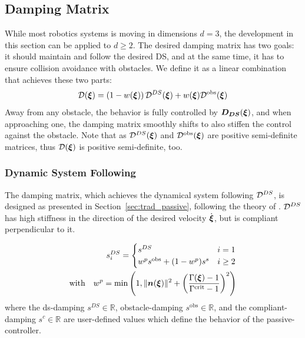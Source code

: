 \documentclass[conference]{IEEEtran}
\begin{document}
\subsection{Damping Matrix}
While most robotics systems is moving in dimensions $d = 3$, the development in this section can be applied to $d \geq 2$.
The desired damping matrix has two goals: it should maintain and follow the desired DS, and at the same time, it has to ensure collision avoidance with obstacles. We define it as a linear combination that achieves these two parts:
\begin{equation}
    \matd D(\vecs\xi) = \left(1 - w(\vecs\xi) \right) {\matd D^{DS}}(\vecs\xi) + w(\vecs\xi)  {\matd D^{\mathrm{obs}}}(\vecs\xi) \label{eq:damping_summation}
\end{equation}
Away from any obstacle, the behavior is fully controlled by $\boldsymbol{D_{DS}}(\boldsymbol{\xi})$, and when approaching one, the damping matrix smoothly shifts to also stiffen the control against the obstacle. 
Note that as ${\mathcal{D}^{DS}}(\boldsymbol{\xi})$ and $\mathcal{D^{\mathrm{obs}}}(\boldsymbol{\xi})$ are positive semi-definite matrices, thus $\mathcal{D}(\boldsymbol{\xi})$ is positive semi-definite, too.


\subsubsection{Dynamic System Following}
The damping matrix, which achieves the dynamical system following $\mathcal{D}^{DS}$, is designed as presented in Section~\ref{sec:trad_passive}, following the theory of \cite{kronander2015passive}. $\mathcal{D}^{DS}$ has high stiffness in the direction of the desired velocity $\dot{\boldsymbol{\xi}}$, but is compliant perpendicular to it.

\begin{equation}
  \begin{split}
  s_i^{DS} =
  \begin{cases}
    s^{DS} & i = 1 \\
    w^p s^{\mathrm{obs}} + (1- w^p) s^s & i \geq 2 
  \end{cases} \\
  \text{with} \quad
  w^p = \min \left(1,  \| \boldsymbol{n}(\boldsymbol{\xi}) \|^2 + \left(\frac{\Gamma(\boldsymbol{\xi}) -1}{\Gamma^{\mathrm{crit}} - 1}\right) ^2 \right)
  \end{split}
\end{equation}
where the ds-damping $s^{DS} \in \mathbb{R}$, obstacle-damping $s^{\mathrm{obs}} \in \mathbb{R}$, and the compliant-damping $s^c \in \mathbb{R}$ are user-defined values which define the behavior of the passive-controller.
\end{document}
